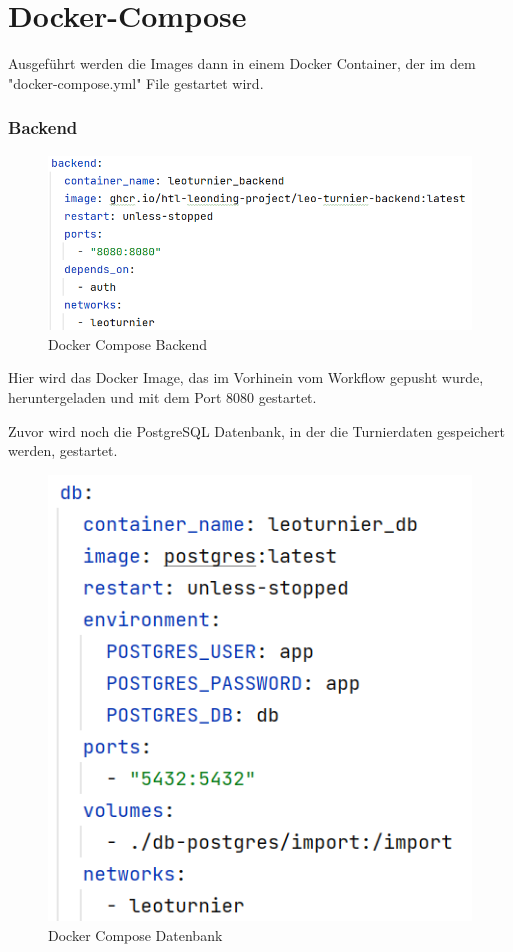 \section{Docker-Compose}

Ausgeführt werden die Images dann in einem Docker Container, der im dem "docker-compose.yml" File gestartet wird. 

\subsubsection{Backend}

\begin{figure}[H]
    \includegraphics[scale=0.4]{pics/docker/docker-compose_backend.png}
    \caption{Docker Compose Backend}
\end{figure}

Hier wird das Docker Image, das im Vorhinein vom Workflow gepusht wurde, heruntergeladen und mit dem Port 8080 gestartet.

Zuvor wird noch die PostgreSQL Datenbank, in der die Turnierdaten gespeichert werden, gestartet.

\begin{figure}[H]
    \includegraphics[scale=0.4]{pics/docker/docker-compose_db.png}
    \caption{Docker Compose Datenbank}
\end{figure}


